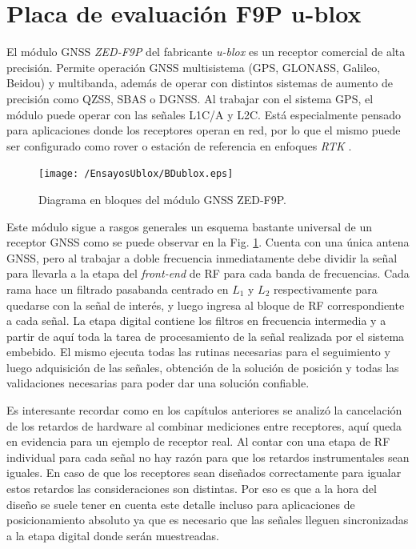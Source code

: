 \documentclass[a4paper,12pt,oneside,onecolumn,final,openright]{book}%
\begin{document}
\section{Placa de evaluación F9P u-blox}
	El módulo GNSS \textit{ZED-F9P} del fabricante \textit{u-blox} es un receptor comercial de alta precisión. Permite operación GNSS multisistema (GPS, GLONASS, Galileo, Beidou) y multibanda, además de operar con distintos sistemas de aumento de precisión como QZSS, SBAS o DGNSS. Al trabajar con el sistema GPS, el módulo puede operar con las señales L1C/A y L2C. Está especialmente pensado para aplicaciones donde los receptores operan en red, por lo que el mismo puede ser configurado como rover o estación de referencia en enfoques \textit{RTK} \cite{ZEDds}.

\begin{figure}
    \centering
    \texttt{[image: /EnsayosUblox/BDublox.eps]}
    \caption{Diagrama en bloques del módulo GNSS ZED-F9P.}
    \label{fig:BDublox}
\end{figure}
	Este módulo sigue a rasgos generales un esquema bastante universal de un receptor GNSS como se puede observar en la Fig. \ref{fig:BDublox}. Cuenta con una única antena GNSS, pero al trabajar a doble frecuencia inmediatamente debe dividir la señal para llevarla a la etapa del \textit{front-end} de RF para cada banda de frecuencias. Cada rama hace un filtrado pasabanda centrado en $L_1$ y $L_2$ respectivamente para quedarse con la señal de interés, y luego ingresa al bloque de RF correspondiente a cada señal. La etapa digital contiene los filtros en frecuencia intermedia y a partir de aquí toda la tarea de procesamiento de la señal realizada por el sistema embebido. El mismo ejecuta todas las rutinas necesarias para el seguimiento y luego adquisición de las señales, obtención de la solución de posición y todas las validaciones necesarias para poder dar una solución confiable.
	
	Es interesante recordar como en los capítulos anteriores se analizó la cancelación de los retardos de hardware al combinar mediciones entre receptores, aquí queda en evidencia para un ejemplo de receptor real. Al contar con una etapa de RF individual para cada señal no hay razón para que los retardos instrumentales sean iguales. En caso de que los receptores sean diseñados correctamente para igualar estos retardos las consideraciones son distintas. Por eso es que a la hora del diseño se suele tener en cuenta este detalle incluso para aplicaciones de posicionamiento absoluto ya que es necesario que las señales lleguen sincronizadas a la etapa digital donde serán muestreadas. 
	
\end{document}

